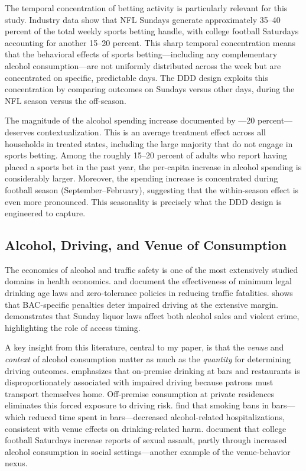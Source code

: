 \documentclass[12pt]{article}
\begin{document}
The temporal concentration of betting activity is particularly relevant for this study. Industry data show that NFL Sundays generate approximately 35--40 percent of the total weekly sports betting handle, with college football Saturdays accounting for another 15--20 percent. This sharp temporal concentration means that the behavioral effects of sports betting---including any complementary alcohol consumption---are not uniformly distributed across the week but are concentrated on specific, predictable days. The DDD design exploits this concentration by comparing outcomes on Sundays versus other days, during the NFL season versus the off-season.

The magnitude of the alcohol spending increase documented by \citet{taylor2024betting}---20 percent---deserves contextualization. This is an average treatment effect across all households in treated states, including the large majority that do not engage in sports betting. Among the roughly 15--20 percent of adults who report having placed a sports bet in the past year, the per-capita increase in alcohol spending is considerably larger. Moreover, the spending increase is concentrated during football season (September--February), suggesting that the within-season effect is even more pronounced. This seasonality is precisely what the DDD design is engineered to capture.

\subsection{Alcohol, Driving, and Venue of Consumption}

The economics of alcohol and traffic safety is one of the most extensively studied domains in health economics. \citet{dee1999state} and \citet{carpenter2004new} document the effectiveness of minimum legal drinking age laws and zero-tolerance policies in reducing traffic fatalities. \citet{hansen2015punishment} shows that BAC-specific penalties deter impaired driving at the extensive margin. \citet{heaton2012sunday} demonstrates that Sunday liquor laws affect both alcohol sales and violent crime, highlighting the role of access timing.

A key insight from this literature, central to my paper, is that the \emph{venue} and \emph{context} of alcohol consumption matter as much as the \emph{quantity} for determining driving outcomes. \citet{cook2007drinking} emphasizes that on-premise drinking at bars and restaurants is disproportionately associated with impaired driving because patrons must transport themselves home. Off-premise consumption at private residences eliminates this forced exposure to driving risk. \citet{cotti2015effects} find that smoking bans in bars---which reduced time spent in bars---decreased alcohol-related hospitalizations, consistent with venue effects on drinking-related harm. \citet{lindo2018college} document that college football Saturdays increase reports of sexual assault, partly through increased alcohol consumption in social settings---another example of the venue-behavior nexus.
\end{document}
